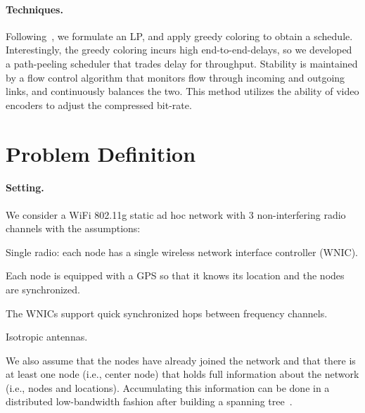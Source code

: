 \documentclass[12pt]{article}
\newenvironment{proof sketch}[1]{\noindent {\emph{Proof sketch of #1:}}}{\hfill \qed}
\begin{document}
\paragraph{Techniques.}
Following~\cite{kumar2005algorithmic,alicherry2005joint11,buragohain2007improved,ChafekarCapacity,EMM11},
we formulate an LP, and apply greedy coloring to obtain a schedule.
Interestingly, the greedy coloring incurs high end-to-end-delays, so
we developed a path-peeling scheduler that trades delay for
throughput. Stability is maintained by a flow control algorithm that
monitors flow through incoming and outgoing links, and continuously
balances the two. This method utilizes the ability of video encoders
to adjust the compressed bit-rate.

\section{Problem Definition}\label{sec:problem}
\paragraph{Setting.}
We consider a WiFi 802.11g static ad hoc network with $3$ non-interfering radio
channels with the assumptions:
\begin{inparaenum}[(i)]
\item Single radio: each node has a single wireless network interface
  controller (WNIC).
\item Each node is equipped with a GPS so that it knows
  its location and the nodes are synchronized.
\item The WNICs support quick synchronized hops between frequency
  channels.
\item Isotropic antennas.
\item We also assume that the nodes have already joined the network
  and that there is at least one node (i.e., center node) that holds
  full information about the network (i.e., nodes and locations).
  Accumulating this information can be done in a distributed
  low-bandwidth fashion after building a spanning
  tree~\cite{awerbuch1987optimal}.
\end{inparaenum}
\end{document}
